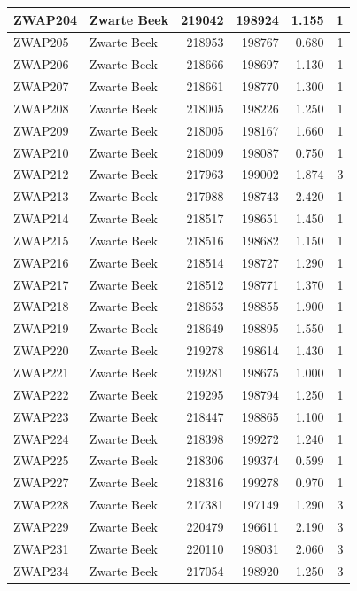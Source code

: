 \documentclass[11pt,]{book}
\begin{document}
\begin{table}
\begin{tabular}[t]{l|l|r|r|r|r}
\hline
ZWAP204 & Zwarte Beek & 219042 & 198924 & 1.155 & 1\\
\hline
ZWAP205 & Zwarte Beek & 218953 & 198767 & 0.680 & 1\\
\hline
ZWAP206 & Zwarte Beek & 218666 & 198697 & 1.130 & 1\\
\hline
ZWAP207 & Zwarte Beek & 218661 & 198770 & 1.300 & 1\\
\hline
ZWAP208 & Zwarte Beek & 218005 & 198226 & 1.250 & 1\\
\hline
ZWAP209 & Zwarte Beek & 218005 & 198167 & 1.660 & 1\\
\hline
ZWAP210 & Zwarte Beek & 218009 & 198087 & 0.750 & 1\\
\hline
ZWAP212 & Zwarte Beek & 217963 & 199002 & 1.874 & 3\\
\hline
ZWAP213 & Zwarte Beek & 217988 & 198743 & 2.420 & 1\\
\hline
ZWAP214 & Zwarte Beek & 218517 & 198651 & 1.450 & 1\\
\hline
ZWAP215 & Zwarte Beek & 218516 & 198682 & 1.150 & 1\\
\hline
ZWAP216 & Zwarte Beek & 218514 & 198727 & 1.290 & 1\\
\hline
ZWAP217 & Zwarte Beek & 218512 & 198771 & 1.370 & 1\\
\hline
ZWAP218 & Zwarte Beek & 218653 & 198855 & 1.900 & 1\\
\hline
ZWAP219 & Zwarte Beek & 218649 & 198895 & 1.550 & 1\\
\hline
ZWAP220 & Zwarte Beek & 219278 & 198614 & 1.430 & 1\\
\hline
ZWAP221 & Zwarte Beek & 219281 & 198675 & 1.000 & 1\\
\hline
ZWAP222 & Zwarte Beek & 219295 & 198794 & 1.250 & 1\\
\hline
ZWAP223 & Zwarte Beek & 218447 & 198865 & 1.100 & 1\\
\hline
ZWAP224 & Zwarte Beek & 218398 & 199272 & 1.240 & 1\\
\hline
ZWAP225 & Zwarte Beek & 218306 & 199374 & 0.599 & 1\\
\hline
ZWAP227 & Zwarte Beek & 218316 & 199278 & 0.970 & 1\\
\hline
ZWAP228 & Zwarte Beek & 217381 & 197149 & 1.290 & 3\\
\hline
ZWAP229 & Zwarte Beek & 220479 & 196611 & 2.190 & 3\\
\hline
ZWAP231 & Zwarte Beek & 220110 & 198031 & 2.060 & 3\\
\hline
ZWAP234 & Zwarte Beek & 217054 & 198920 & 1.250 & 3\\

\end{tabular}
\end{table}
\end{document}
